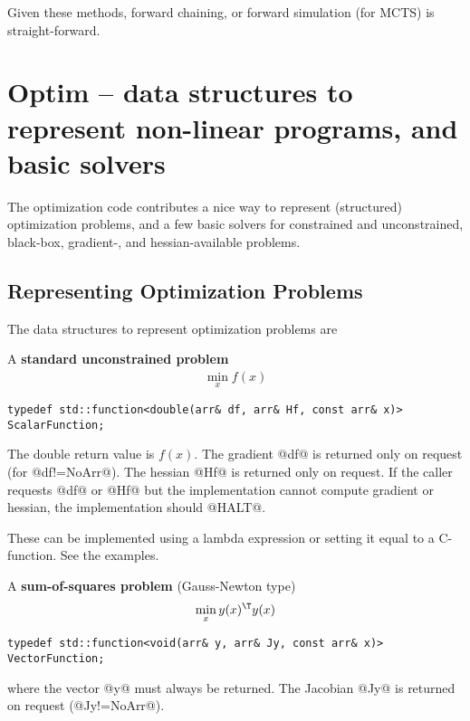 \documentclass[10pt,fleqn,twoside]{article}
\begin{document}
{{Given these methods, forward chaining, or forward simulation (for
MCTS) is straight-forward. 

\section{Optim -- data structures to represent non-linear programs, and
  basic solvers}

The optimization code contributes a nice way to represent (structured)
optimization problems, and a few basic solvers for constrained and
unconstrained, black-box, gradient-, and hessian-available problems.

\subsection{Representing Optimization Problems}

The data structures to represent optimization problems are

A \textbf{standard unconstrained problem}
\begin{align}
\min_x f(x)
\end{align}
\begin{shaded}
\begin{Verbatim}
typedef std::function<double(arr& df, arr& Hf, const arr& x)> ScalarFunction;
\end{Verbatim}
\end{shaded}
The double return value is $f(x)$. The gradient @df@ is returned only
on request (for @df!=NoArr@). The hessian @Hf@ is returned only on
request. If the caller requests @df@ or @Hf@ but the implementation
cannot compute gradient or hessian, the implementation should @HALT@.

These can be implemented using a lambda expression or setting it equal
to a C-function. See the examples. 

A \textbf{sum-of-squares problem} (Gauss-Newton type)
\begin{align}
\min_x y(x)^\T y(x)
\end{align}
\begin{shaded}
\begin{Verbatim}
typedef std::function<void(arr& y, arr& Jy, const arr& x)> VectorFunction;
\end{Verbatim}
\end{shaded}
where the vector @y@ must always be returned. The Jacobian @Jy@ is
returned on request (@Jy!=NoArr@).

}}
\end{document}
